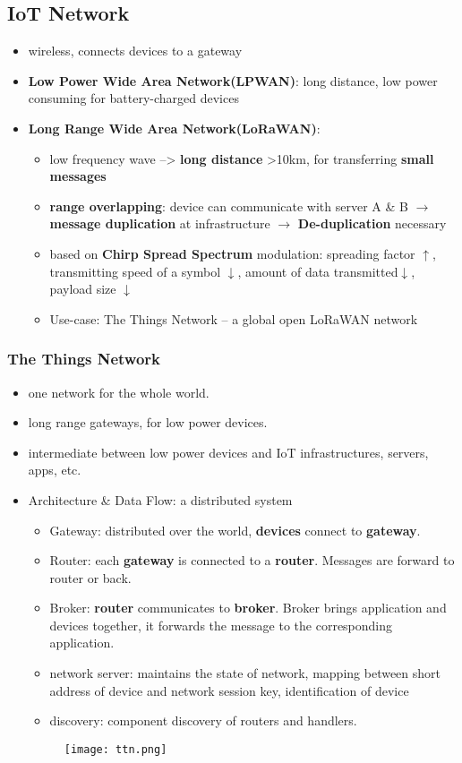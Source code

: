 \subsection{IoT Network}
\begin{itemize}
	\item wireless, connects devices to a gateway
	\item \textbf{Low Power Wide Area Network(LPWAN)}: long distance, low power consuming for battery-charged devices
	
	
	\item \textbf{Long Range Wide Area Network(LoRaWAN)}: 
	\begin{itemize}
		\item low frequency wave --> \textbf{long distance} >10km, for transferring \textbf{small messages}
		\item \textbf{range overlapping}: device can communicate with server A \& B $\rightarrow$ \textbf{message duplication} at infrastructure $\rightarrow$ \textbf{De-duplication} necessary
		\item based on \textbf{Chirp Spread Spectrum} modulation: spreading factor $\uparrow$, transmitting speed of a symbol $\downarrow$, amount of data transmitted$\downarrow$, payload size $\downarrow$
		\item Use-case: The Things Network -- a global open LoRaWAN network
	\end{itemize}
	
\end{itemize}

\subsubsection{The Things Network}
\begin{itemize}
	\item one network for the whole world.
	\item long range gateways, for low power devices.
	\item intermediate between low power devices and IoT infrastructures, servers, apps, etc.
	\item Architecture \& Data Flow: a distributed system
	\begin{itemize}
		\item Gateway: distributed over the world, \textbf{devices} connect to \textbf{gateway}. 
		\item Router: each \textbf{gateway} is connected to a \textbf{router}. Messages are forward to router or back.
		\item Broker: \textbf{router} communicates to \textbf{broker}. Broker brings application and devices together, it forwards the message to the corresponding application.
		\item network server: maintains the state of network, mapping between short address of device and network session key, identification of device
		\item discovery: component discovery of routers and handlers.
	\end{itemize}
	\begin{figure}[H]
		\centering
		\texttt{[image: ttn.png]}
	\end{figure}
\end{itemize}